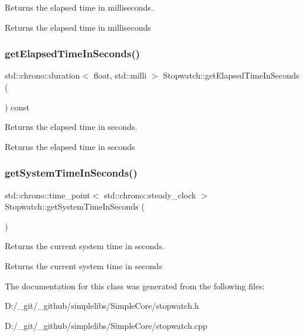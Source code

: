 Returns the elapsed time in milliseconds. 

\begin{DoxyReturn}{Returns}
the elapsed time in milliseconds 
\end{DoxyReturn}
\mbox{\label{class_stopwatch_a8fd9786f99abeb8289ba235d0e47cf26}} 
\subsubsection{\texorpdfstring{getElapsedTimeInSeconds()}{getElapsedTimeInSeconds()}}
{\footnotesize\ttfamily std\+::chrono\+::duration$<$ float, std\+::milli $>$ Stopwatch\+::get\+Elapsed\+Time\+In\+Seconds (\begin{DoxyParamCaption}{ }\end{DoxyParamCaption}) const}



Returns the elapsed time in seconds. 

\begin{DoxyReturn}{Returns}
the elapsed time in seconds 
\end{DoxyReturn}
\mbox{\label{class_stopwatch_aed8349df72b0a516d6d43022414d8620}} 
\subsubsection{\texorpdfstring{getSystemTimeInSeconds()}{getSystemTimeInSeconds()}}
{\footnotesize\ttfamily std\+::chrono\+::time\+\_\+point$<$ std\+::chrono\+::steady\+\_\+clock $>$ Stopwatch\+::get\+System\+Time\+In\+Seconds (\begin{DoxyParamCaption}{ }\end{DoxyParamCaption})\hspace{0.3cm}{\ttfamily [static]}}



Returns the current system time in seconds. 

\begin{DoxyReturn}{Returns}
the current system time in seconds 
\end{DoxyReturn}


The documentation for this class was generated from the following files\+:\begin{DoxyCompactItemize}
\item 
D\+:/\+\_\+git/\+\_\+github/simplelibs/\+Simple\+Core/stopwatch.\+h\item 
D\+:/\+\_\+git/\+\_\+github/simplelibs/\+Simple\+Core/stopwatch.\+cpp\end{DoxyCompactItemize}
